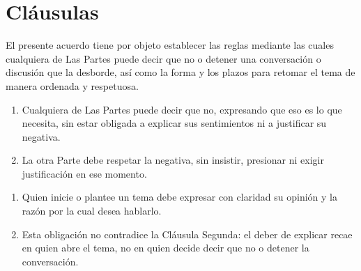 
\section{Cláusulas}


El presente acuerdo tiene por objeto establecer las reglas mediante las cuales cualquiera de Las Partes puede decir que no o detener una conversación o discusión que la desborde, así como la forma y los plazos para retomar el tema de manera ordenada y respetuosa.


\begin{enumerate}[label=\arabic*., leftmargin=*, itemsep=0.3em]
  \item Cualquiera de Las Partes puede decir que no, expresando que eso es lo que necesita, sin estar obligada a explicar sus sentimientos ni a justificar su negativa.
  \item La otra Parte debe respetar la negativa, sin insistir, presionar ni exigir justificación en ese momento.
\end{enumerate}


\begin{enumerate}[label=\arabic*., leftmargin=*, itemsep=0.3em]
  \item Quien inicie o plantee un tema debe expresar con claridad su opinión y la razón por la cual desea hablarlo.
  \item Esta obligación no contradice la Cláusula Segunda: el deber de explicar recae en quien abre el tema, no en quien decide decir que no o detener la conversación.
\end{enumerate}


